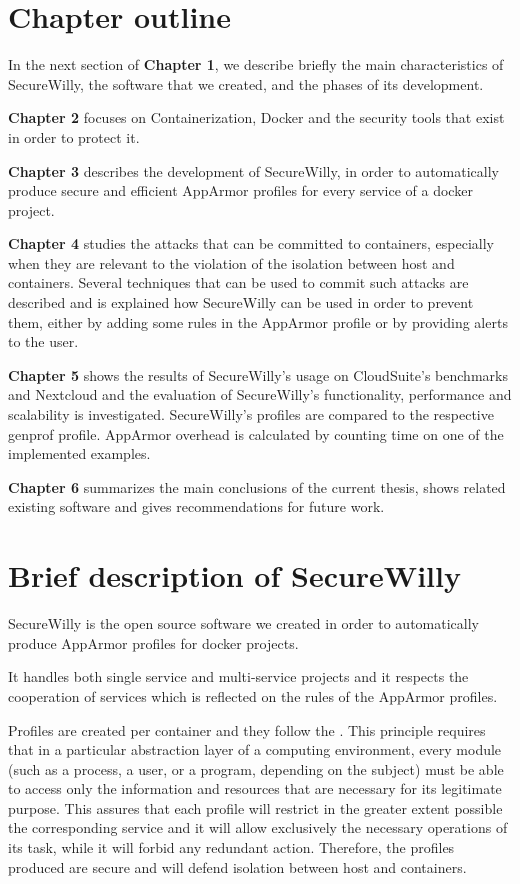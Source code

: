 \section{Chapter outline}
In the next section of \textbf{Chapter 1}, we describe briefly the main characteristics of SecureWilly, the software that we created, and the phases of its development.

\textbf{Chapter 2}  focuses on Containerization, Docker and the security tools that exist in order to protect it.

\textbf{Chapter 3} describes the development of SecureWilly, in order to automatically produce secure and efficient AppArmor profiles for every service of a docker project. 

\textbf{Chapter 4} studies the attacks that can be committed to containers, especially when they are relevant to the violation of the isolation between host and containers. Several techniques that can be used to commit such attacks are described and is explained how SecureWilly can be used in order to prevent them, either by adding some rules in the AppArmor profile or by providing alerts to the user.

\textbf{Chapter 5} shows the results of SecureWilly's usage on CloudSuite's benchmarks and Nextcloud and the evaluation of SecureWilly's functionality, performance and scalability is investigated. SecureWilly's profiles are compared to the respective genprof profile. AppArmor overhead is calculated by counting time on one of the implemented examples.

\textbf{Chapter 6} summarizes the main conclusions of the current thesis, shows related existing software and gives recommendations for future work. 

\section{Brief description of SecureWilly}
SecureWilly is the open source software we created in order to automatically produce AppArmor profiles for docker projects.

It handles both single service and multi-service projects and it respects the cooperation of services which is reflected on the rules of the AppArmor profiles.

Profiles are created per container and they follow the . This principle requires that in a particular abstraction layer of a computing environment, every module (such as a process, a user, or a program, depending on the subject) must be able to access only the information and resources that are necessary for its legitimate purpose. \cite{polp} This assures that each profile will restrict in the greater extent possible the corresponding service and it will allow exclusively the necessary operations of its task, while it will forbid any redundant action. Therefore, the profiles produced are secure and will defend isolation between host and containers.

